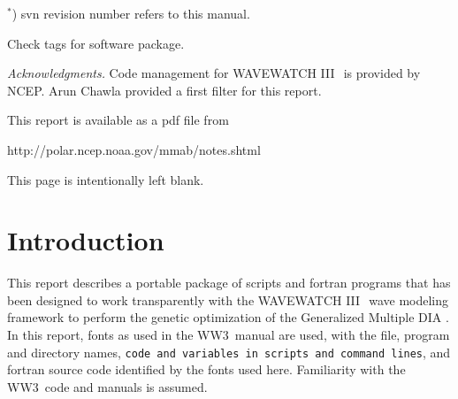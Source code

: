 \documentclass[12pt]{article}
\newcommand{\pstyle}{plain}
\newcommand{\wwt}{WAVEWATCH III$\:$\textsuperscript\textregistered}
\newcommand{\ws}{WW3}
\newcommand{\gmd}{GMD}
\newcommand{\file}{\sf}
\newcommand{\code}{\tt}
\newcommand{\F}{\sc}
\newcommand{\pb}{\strut \vfill \pagebreak}
\newcommand{\bpagea}{\strut

\vspace{2.5in} \centerline{This page is intentionally left blank.}}
\newcommand{\newsec}{\setcounter{equation}{0}
                      \setcounter{myfigno}{0}
                      \setcounter{mytabno}{0}}
\newcounter{myfigno}[section]
\newcounter{mytabno}[section]
\begin{document}
\hspace{55mm} $^*$) svn revision number refers to this manual.

\hspace{59mm}  Check tags for software package.

\vfill \pagebreak



{\it Acknowledgments.} Code management for \wwt\ is provided by NCEP. Arun
Chawla provided a first filter for this report.

\vspace{\baselineskip} \noindent
This report is available as a pdf file from

\vspace{\baselineskip}
\centerline{http://polar.ncep.noaa.gov/mmab/notes.shtml}


\vfill \pagebreak

\tableofcontents

\pb
\pagestyle{empty}

\bpagea


\pb
\pagestyle{\pstyle}
\section{Introduction} \label{sec:intro}
\newsec

\noindent
This report describes a portable package of scripts and {\F fortran} programs
that has been designed to work transparently with the \wwt\ wave modeling
framework \citep[model henceforth denoted as \ws]{tol:MMABmanual} to perform
the genetic optimization \citep[e.g.,][]{bk:ES03} of the Generalized Multiple
DIA \citep[\gmd,][]{tol:MMABmanual, tol:OMOD13d, tol:OMOD13e}.  In this
report, fonts as used in the \ws\ manual are used, with the {\file file,
program and directory names}, {\code code and variables in scripts and command
lines}, and {\F fortran} source code identified by the fonts used
here. Familiarity with the \ws\ code and manuals is assumed.
\end{document}

